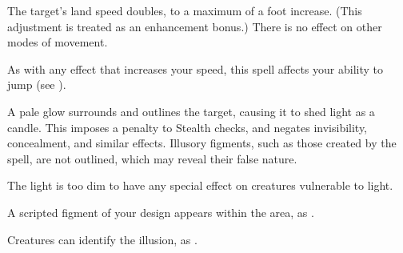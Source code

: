 \begin{spellheader}
    \spellrng{\rngclose}
    \spelldur{\durshort \dismissable}
\end{spellheader}
\begin{spelleffects}
    \spelleffect The target's land speed doubles, to a maximum of a  foot increase. (This adjustment is treated as an enhancement bonus.) There is no effect on other modes of movement.
\end{spelleffects}
\begin{spellfooter}
    \spellnotes As with any effect that increases your speed, this spell affects your ability to jump (see ).
\end{spellfooter}

\begin{comment}
\subsubsection{F}
\end{comment}

\begin{spellheader}
    \spelldur{\durshort \dismissable}
\end{spellheader}
\begin{spelleffects}
    \spelleffect A pale glow surrounds and outlines the target, causing it to shed light as a candle. This imposes a  penalty to Stealth checks, and negates invisibility, concealment, and similar effects. Illusory figments, such as those created by the  spell, are not outlined, which may reveal their false nature.
\end{spelleffects}
\begin{spellfooter}
    \spellnotes The light is too dim to have any special effect on creatures vulnerable to light.
\end{spellfooter}

\begin{spellheader}
    \spelldur{\durlong \dismissable}
\end{spellheader}
\begin{spelleffects}
    \spelleffect A scripted figment of your design appears within the area, as .
\end{spelleffects}
\begin{spellfooter}
    \spellnotes Creatures can identify the illusion, as .
\end{spellfooter}

